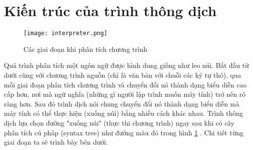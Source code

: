 \section{Kiến trúc của trình thông dịch}
\begin{figure}[h]
    \texttt{[image: interpreter.png]}   
    \centering
    \caption{Các giai đoạn khi phân tích chương trình} 
    \label{fig:stages}
\end{figure}

Quá trình phân tích một ngôn ngữ được hình dung giống như leo núi. Bắt đầu từ dưới cùng với chương trình nguồn (chỉ là văn bản với chuỗi các ký tự thô), qua mỗi giai đoạn phân tích chương trình và chuyển đổi nó thành dạng biểu diễn cao cấp hơn, nơi mà ngữ nghĩa (những gì người lập trình muốn máy tính) trở nên rõ ràng hơn. Sau đó trình dịch nói chung chuyển đổi nó thành dạng biểu diễn mà máy tính có thể thực hiện (xuống núi) bằng nhiều cách khác nhau. Trình thông dịch lựa chọn đường "xuống núi" (thực thi chương trình) ngay sau khi có cây phân tích cú pháp (syntax tree) như đường màu đỏ trong hình \ref{fig:stages} \cite{craftinginterpreters}. Chi tiết từng giai đoạn ta sẽ trình bày bên dưới.







